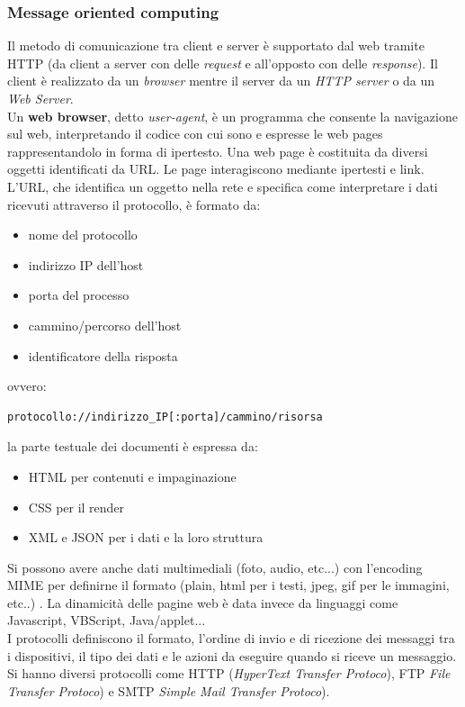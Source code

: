 \documentclass[a4paper,12pt, oneside]{book}
\begin{document}
\subsubsection{Message oriented computing}
Il metodo di comunicazione tra client e server è supportato dal web tramite HTTP (da client a server con delle \textit{request} e all'opposto con delle \textit{response}). Il client è realizzato da un \textit{browser} mentre il server da un \textit{HTTP server} o da un \textit{Web Server}.\\
Un \textbf{web browser}, detto \textit{user-agent}, è un programma che consente la navigazione sul web, interpretando il codice con cui sono e espresse le web pages rappresentandolo in forma di ipertesto. Una web page è costituita da diversi oggetti identificati da URL. Le page interagiscono mediante ipertesti e link.\\
L'URL, che identifica un oggetto nella rete e specifica come interpretare i
dati ricevuti attraverso il protocollo, è formato da:
\begin{itemize}
	\item nome del protocollo
	\item indirizzo IP dell'host
	\item porta del processo
	\item cammino/percorso dell'host
	\item identificatore della risposta
\end{itemize}
ovvero: \begin{verbatim}
protocollo://indirizzo_IP[:porta]/cammino/risorsa
\end{verbatim}
la parte testuale dei documenti è espressa da:
\begin{itemize}
	\item HTML per contenuti e impaginazione
	\item CSS per il render
	\item XML e JSON per i dati e la loro struttura
\end{itemize}
Si possono avere anche dati multimediali (foto, audio, etc...) con l'encoding MIME per definirne il formato (plain, html per i testi, jpeg, gif per le immagini, etc..) . La dinamicità delle pagine web è data invece da linguaggi come Javascript, VBScript, Java/applet...\\
I protocolli definiscono il formato, l'ordine di invio e di ricezione dei messaggi tra i dispositivi, il tipo dei dati e le azioni da eseguire quando si riceve un messaggio. Si hanno diversi protocolli come HTTP (\textit{HyperText Transfer Protoco}), FTP \textit{File Transfer Protoco}) e SMTP \textit{Simple Mail Transfer Protoco}).\\
\end{document}
